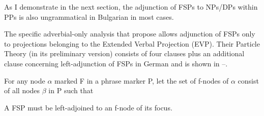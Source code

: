 \documentclass[output=paper,colorlinks,citecolor=brown]{langscibook}
\begin{document}
\noindent As I demonstrate in the next section, the adjunction of FSPs to NPs/DPs within PPs is also ungrammatical in Bulgarian in most cases. \par 
The specific adverbial-only analysis that \citet[ex. 6]{BuringHartmann2001} propose allows adjunction of FSPs only to projections belonging to the Extended Verbal Projection (EVP). Their Particle Theory (in its preliminary version) consists of four clauses plus an additional clause concerning left-adjunction of FSPs in German and is shown in --. 

\newpage
\ea\label{BuringHartmann:basic2}
For any node $\alpha$ marked F in a phrase marker P, let the set of f-nodes of $\alpha$ consist of all nodes $\beta$ in P such that 
\label{BuringHartmann:basic2a}
\label{BuringHartmann:basic2b}
\label{BuringHartmann:basic2c}
\label{BuringHartmann:basic2d}
\z
\z 

\ea\label{BuringHartmann:basic3}
A FSP must be left-adjoined to an f-node of its focus. \\\hfill \citep[ex. 12]{BuringHartmann2001}
\z
\end{document}
